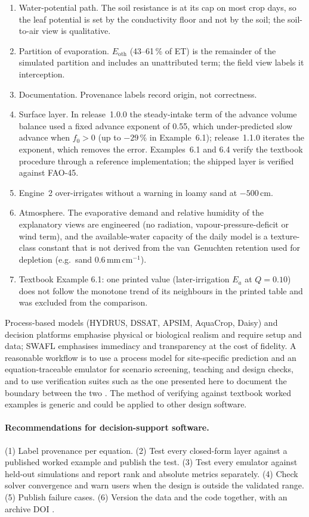 \begin{enumerate}[nosep]
\item Water-potential path. The soil resistance is at its cap on most crop days, so the leaf potential is set by the conductivity floor and not by the soil; the soil-to-air view is qualitative.
\item Partition of evaporation. $E_{\mathrm{oth}}$ (43--61\,\% of ET) is the remainder of the simulated partition and includes an unattributed term; the field view labels it interception.
\item Documentation. Provenance labels record origin, not correctness.
\item Surface layer. In release~1.0.0 the steady-intake term of the advance volume balance used a fixed advance exponent of 0.55, which under-predicted slow advance when $f_0>0$ (up to $-29$\,\% in Example~6.1); release~1.1.0 iterates the exponent, which removes the error. Examples~6.1 and 6.4 verify the textbook procedure through a reference implementation; the shipped layer is verified against FAO-45.
\item Engine~2 over-irrigates without a warning in loamy sand at $-500$\,cm.
\item Atmosphere. The evaporative demand and relative humidity of the explanatory views are engineered (no radiation, vapour-pressure-deficit or wind term), and the available-water capacity of the daily model is a texture-class constant that is not derived from the van~Genuchten retention used for depletion (e.g.\ sand 0.6\,mm\,cm$^{-1}$).
\item Textbook Example 6.1: one printed value (later-irrigation $E_a$ at $Q=0.10$) does not follow the monotone trend of its neighbours in the printed table and was excluded from the comparison.
\end{enumerate}

Process-based models (HYDRUS, DSSAT, APSIM, AquaCrop, Daisy) and decision platforms emphasise physical or biological realism and require setup and data; SWAFL emphasises immediacy and transparency at the cost of fidelity. A reasonable workflow is to use a process model for site-specific prediction and an equation-traceable emulator for scenario screening, teaching and design checks, and to use verification suites such as the one presented here to document the boundary between the two \citep{Razavi2012,Asher2015}. The method of verifying against textbook worked examples is generic and could be applied to other design software.

\paragraph{Recommendations for decision-support software.} (1) Label provenance per equation. (2) Test every closed-form layer against a published worked example and publish the test. (3) Test every emulator against held-out simulations and report rank and absolute metrics separately. (4) Check solver convergence and warn users when the design is outside the validated range. (5) Publish failure cases. (6) Version the data and the code together, with an archive DOI \citep{Wilkinson2016}.

